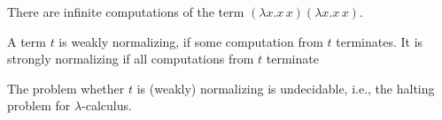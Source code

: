\begin{remark}
    There are infinite computations of the term $(\lambda x. x\, x)(\lambda x. x\, x)$.
\end{remark}

\begin{definition}
    A term $t$ is weakly normalizing, if some computation from $t$ terminates. It is strongly normalizing if all computations from $t$ terminate
\end{definition}

\begin{theorem}[Church]
    The problem whether $t$ is (weakly) normalizing is undecidable, i.e., the halting problem for $\lambda$-calculus.
\end{theorem}